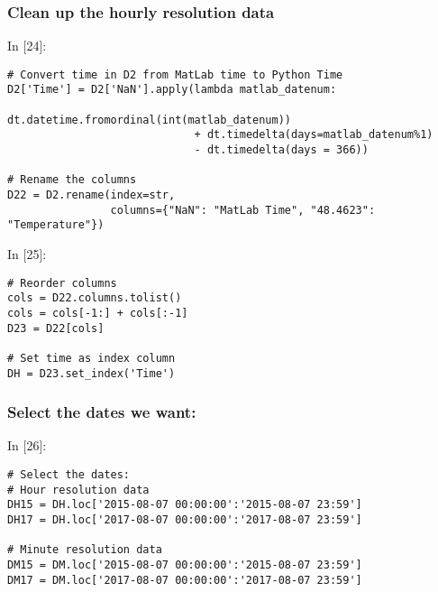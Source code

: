 \documentclass[11pt]{article}
\newif\ifcode
\newif\ifleftmargins
\newlength{\promptlength}
\newcommand{\prompt}[3]{
        \needspace{1.1cm}
        \settowidth{\promptlength}{ #1 [#3] }
        \ifleftmargins\hspace{-\promptlength}\hspace{-5pt}\fi
        {\color{#2}#1 [#3]:}
        \ifleftmargins\vspace{-2.7ex}\fi
    }
\begin{document}
    \hypertarget{clean-up-the-hourly-resolution-data}{%
\subsubsection{Clean up the hourly resolution
data}\label{clean-up-the-hourly-resolution-data}}

    
\prompt{In}{incolor}{24}
\codetrue
\begin{tcolorbox}[breakable, size=fbox, boxrule=1pt, pad at break*=1mm, colback=cellbackground, colframe=cellborder]
\begin{verbatim}
# Convert time in D2 from MatLab time to Python Time
D2['Time'] = D2['NaN'].apply(lambda matlab_datenum: 
                             dt.datetime.fromordinal(int(matlab_datenum)) 
                             + dt.timedelta(days=matlab_datenum%1)
                             - dt.timedelta(days = 366)) 

# Rename the columns
D22 = D2.rename(index=str, 
                columns={"NaN": "MatLab Time", "48.4623": "Temperature"})
\end{verbatim}
\end{tcolorbox}
\codefalse

    
\prompt{In}{incolor}{25}
\codetrue
\begin{tcolorbox}[breakable, size=fbox, boxrule=1pt, pad at break*=1mm, colback=cellbackground, colframe=cellborder]
\begin{verbatim}
# Reorder columns 
cols = D22.columns.tolist()
cols = cols[-1:] + cols[:-1]
D23 = D22[cols]

# Set time as index column
DH = D23.set_index('Time')
\end{verbatim}
\end{tcolorbox}
\codefalse

    \hypertarget{select-the-dates-we-want}{%
\subsubsection{Select the dates we
want:}\label{select-the-dates-we-want}}

    
\prompt{In}{incolor}{26}
\codetrue
\begin{tcolorbox}[breakable, size=fbox, boxrule=1pt, pad at break*=1mm, colback=cellbackground, colframe=cellborder]
\begin{verbatim}
# Select the dates:
# Hour resolution data
DH15 = DH.loc['2015-08-07 00:00:00':'2015-08-07 23:59']
DH17 = DH.loc['2017-08-07 00:00:00':'2017-08-07 23:59']

# Minute resolution data
DM15 = DM.loc['2015-08-07 00:00:00':'2015-08-07 23:59']
DM17 = DM.loc['2017-08-07 00:00:00':'2017-08-07 23:59']
\end{verbatim}
\end{tcolorbox}
\codefalse
\end{document}
